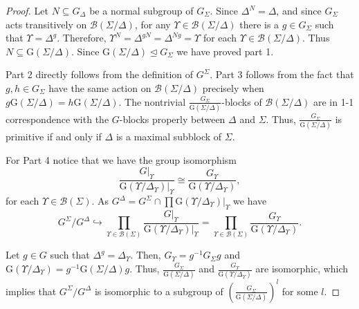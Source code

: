 \documentclass{llncs}
\newcommand{\Blocks}[1]{{\ensuremath{\mathcal{B}\left(#1\right)}}}
\newcommand{\Gof}[1]{{\ensuremath{\mathrm{G}\left(#1\right)}}}
\newcommand{\pr}[2]{{\ensuremath{\left.{#1}\right\vert_{#2}}}}
\begin{document}
\begin{proof}
  Let $N\subseteq G_\Delta$ be a normal subgroup of $G_\Sigma$. Since
  $\Delta^N = \Delta$, and since $G_\Sigma$ acts transitively on
  $\Blocks{\Sigma/\Delta}$, for any $\Upsilon \in
  \Blocks{\Sigma/\Delta}$ there is a $g \in G_\Sigma$ such that
  $\Upsilon = \Delta^g$. Therefore, $\Upsilon^N = \Delta^{gN} =
  \Delta^{Ng}= \Upsilon$ for each $\Upsilon \in
  \Blocks{\Sigma/\Delta}$. Thus $N\subseteq \Gof{\Sigma/\Delta}$.
  Since $\Gof{\Sigma/\Delta}\unlhd G_\Sigma$ we have proved part 1.

  Part 2 directly follows from the definition of $G^\Sigma$. Part 3
  follows from the fact that $g, h\in G_\Sigma$ have the same action
  on $\Blocks{\Sigma/\Delta}$ precisely when
  $g\Gof{\Sigma/\Delta}=h\Gof{\Sigma/\Delta}$. The nontrivial
  $\frac{G_\Sigma}{\Gof{\Sigma/\Delta}}$-blocks of
  $\Blocks{\Sigma/\Delta}$ are in 1-1 correspondence with the
  $G$-blocks properly between $\Delta$ and $\Sigma$. Thus,
  $\frac{G_\Sigma}{\Gof{\Sigma/\Delta}}$ is primitive if and only if
  $\Delta$ is a maximal subblock of $\Sigma$.

  For Part 4 notice that we have the group isomorphism
  \[
  \frac{\pr{G}{\Upsilon}}{\pr{\Gof{\Upsilon/\Delta_{\Upsilon}}}{\Upsilon}}
  \cong \frac{G_\Upsilon}{\Gof{\Upsilon/\Delta_{\Upsilon}}},
  \]
  for each $\Upsilon\in\Blocks{\Sigma}$. As $G^\Delta = G^\Sigma \cap
  \prod \pr{\Gof{\Upsilon/\Delta_\Upsilon}}{\Upsilon}$ we have
  \[
  G^\Sigma /G^\Delta \hookrightarrow \prod_{\Upsilon \in
    \Blocks{\Sigma}}
  \frac{\pr{G}{\Upsilon}}{\pr{\Gof{\Upsilon/\Delta_{\Upsilon}}}{\Upsilon}}
  = \prod_{\Upsilon \in \Blocks{\Sigma}}
  \frac{G_\Upsilon}{\Gof{\Upsilon/\Delta_{\Upsilon}}}.\]

  Let $g \in G$ such that $\Delta^g=\Delta_{\Upsilon}$. Then,
  $G_\Upsilon = g^{-1} G_\Sigma g$ and $\Gof{\Upsilon/\Delta_\Upsilon}
  = g^{-1}\Gof{\Sigma/\Delta}g$. Thus,
  $\frac{G_\Sigma}{\Gof{\Sigma/\Delta}}$ and
  $\frac{G_\Upsilon}{\Gof{\Upsilon/\Delta_\Upsilon}}$ are isomorphic,
  which implies that $G^\Sigma/G^\Delta$ is isomorphic to a subgroup
  of $\left(\frac{G_\Sigma}{\Gof{\Sigma/\Delta}}\right)^l$ for some
  $l$.
\end{proof}
\end{document}
